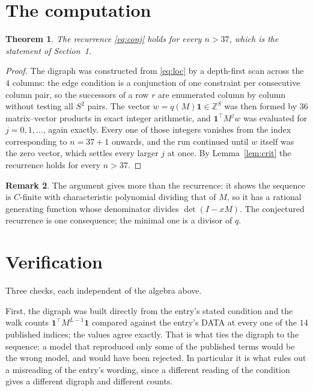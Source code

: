 \documentclass[11pt,a4paper]{article}
\theoremstyle{plain}
\newtheorem{theorem}{Theorem}
\theoremstyle{definition}
\newtheorem{remark}[theorem]{Remark}
\begin{document}
\section{The computation}

\begin{theorem}
The recurrence \eqref{eq:conj} holds for every $n>37$, which is the statement of
Section~1.
\end{theorem}

\begin{proof}
The digraph was constructed from \eqref{eq:loc} by a depth-first scan across the $4$
columns: the edge condition is a conjunction of one constraint per consecutive column
pair, so the successors of a row $r$ are enumerated column by column without testing all
$S^2$ pairs. The vector $w=q(M)\mathbf{1}\in\mathbb{Z}^{S}$ was then formed by $36$
matrix--vector products in exact integer arithmetic, and $\mathbf{1}^{\!\top}M^{j}w$ was
evaluated for $j=0,1,\dots$, again exactly. Every one of those integers vanishes from the
index corresponding to $n=37+1$ onwards, and the run continued until $w$ itself was the
zero vector, which settles every larger $j$ at once. By Lemma~\ref{lem:crit} the recurrence
holds for every $n>37$.
\end{proof}

\begin{remark}
The argument gives more than the recurrence: it shows the sequence is $C$-finite with
characteristic polynomial dividing that of $M$, so it has a rational generating function
whose denominator divides $\det(I-xM)$. The conjectured recurrence is one consequence; the
minimal one is a divisor of $q$.
\end{remark}

\section{Verification}

Three checks, each independent of the algebra above.

First, the digraph was built directly from the entry's stated condition and the walk counts
$\mathbf{1}^{\!\top}M^{L-1}\mathbf{1}$ compared against the entry's DATA at
every one of the $14$ published indices; the values agree exactly. That is what ties
the digraph to the sequence: a model that reproduced only some of the published terms would
be the wrong model, and would have been rejected. In particular it is what rules out a
misreading of the entry's wording, since a different reading of the condition gives a
different digraph and different counts.
\end{document}
